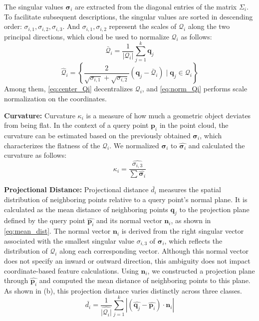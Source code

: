 \documentclass[lettersize,journal]{IEEEtran}
\begin{document}
The singular values \(\mathbf{\sigma}_i\) are extracted from the diagonal entries of the matrix \(\Sigma_i\). To facilitate subsequent descriptions, the singular values are sorted in descending order: \(\sigma_{i,1}, \sigma_{i,2}, \sigma_{i,3}\). And \(\sigma_{i,1}, \sigma_{i,2}\) represent the scales of \( \mathcal{Q}_i \) along the two principal directions, which cloud be used to normalize \( \mathcal{Q}_i \) as follows:
\begin{equation}
    \bar{\mathcal{Q}}_i = \frac{1}{|\mathcal{Q}_i|} \sum_{j=1}^{k} \mathbf{q}_j
    \label{eq:center_Qi}
\end{equation}
\begin{equation}
    \hat{\mathcal{Q}}_i = \left\{ \frac{2}{\sqrt{\sigma_{i,1}} + 
    \sqrt{\sigma_{i,2}}} \left( \mathbf{q}_j - \bar{\mathcal{Q}}_i \right) \mid 
    \mathbf{q}_j\in \mathcal{Q}_i \right\}
    \label{eq:norm_Qi}
\end{equation}
Among them, \eqref{eq:center_Qi} decentralizes \( \mathcal{Q}_i \), and \eqref{eq:norm_Qi} performs scale normalization on the coordinates. 

\textbf{Curvature:} Curvature $\kappa_i$ is a measure of how much a geometric object deviates from being flat. In the context of a query point $\mathbf{p}_i$ in the point cloud, the curvature can be estimated based on the previously obtained \(\mathbf{\sigma}_i\), which characterizes the flatness of the \( \mathcal{Q}_i \). We normalized \(\mathbf{\sigma}_i\) to $\hat{\mathbf{\sigma}_i}$ and calculated the curvature as follows:
\begin{equation}
    \kappa_i = \frac{\hat{\sigma_{i,3}}}{\sum \hat{\mathbf{\sigma}_i}}
    \label{eq:curvature}
\end{equation}

\textbf{Projectional Distance:} Projectional distance $\bar{d_i}$ measures the spatial distribution of neighboring points relative to a query point's normal plane. It is calculated as the mean distance of neighboring points $\mathbf{q}_j$ to the projection plane defined by the query point \(\hat{\mathbf{p}_i} \) and its normal vector \( \mathbf{n}_i \), as shown in \cref{eq:mean_dist}. The normal vector \(\mathbf{n}_i\) is derived from the right singular vector associated with the smallest singular value \(\sigma_{i,3}\) of \(\mathbf{\sigma}_i\), which reflects the distribution of \(\mathcal{Q}_i\) along each corresponding vector. Although this normal vector does not specify an inward or outward direction, this ambiguity does not impact coordinate-based feature calculations. Using \(\mathbf{n}_i\), we constructed a projection plane through \(\hat{\mathbf{p}_i}\) and computed the mean distance of neighboring points to this plane. As shown in (b), this projection distance varies distinctly across three classes.
\begin{equation}
    \bar{d_i} = \frac{1}{\hat{|\mathcal{Q}_i|}} \sum_{j=1}^k |(\hat{\mathbf{q}_j} - \hat{\mathbf{p}_i}) \cdot \mathbf{n}_i|
    \label{eq:mean_dist}
\end{equation}
\end{document}
